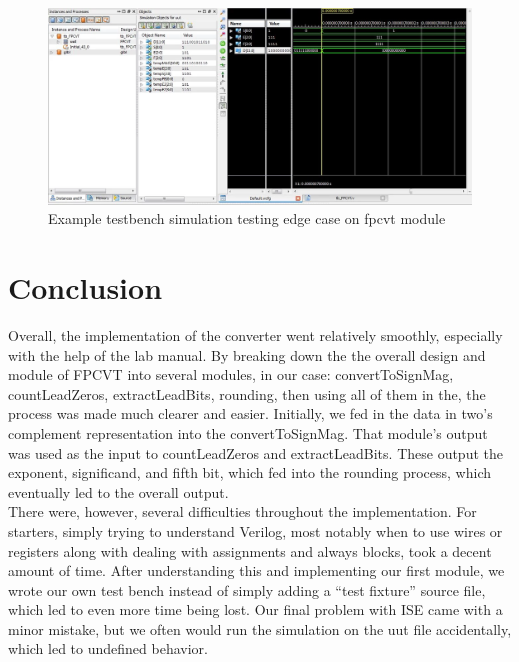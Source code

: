\documentclass{article}
\begin{document}
\begin{figure}[H]
	\begin{center}
		\includegraphics[width=1.2\textwidth]{sim6.png} 
		\caption{Example testbench simulation testing edge case on fpcvt module}
	\end{center}
\end{figure}

\section*{Conclusion}

Overall, the implementation of the converter went relatively smoothly, especially with the help of the lab manual.  By breaking down the the overall design and module of FPCVT into several modules, in our case: convertToSignMag, countLeadZeros, extractLeadBits, rounding, then using all of them in the, the process was made much clearer and easier.  Initially, we fed in the data in two's complement representation into the convertToSignMag.  That module's output was used as the input to countLeadZeros and extractLeadBits.  These output the exponent, significand, and fifth bit, which fed into the rounding process, which eventually led to the overall output. \\

There were, however, several difficulties throughout the implementation.  For starters, simply trying to understand Verilog, most notably when to use wires or registers along with dealing with assignments and always blocks, took a decent amount of time.  After understanding this and implementing our first module, we wrote our own test bench instead of simply adding a ``test fixture'' source file, which led to even more time being lost.  Our final problem with ISE came with a minor mistake, but we often would run the simulation on the uut file accidentally, which led to undefined behavior.  \\
\end{document}
